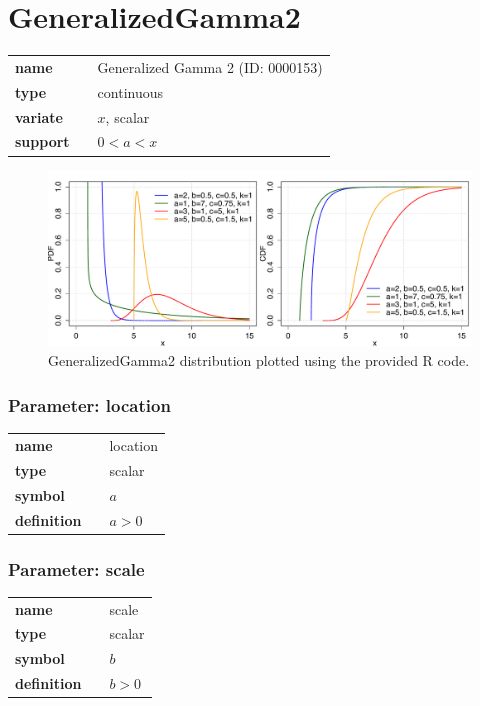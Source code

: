 \section*{GeneralizedGamma2} 

  \bigskip 

\begin{tabular}{p{2cm}cl}
\textbf{name} & & Generalized Gamma 2 (ID: 0000153)\\ 
 
\textbf{type} & & continuous \\ 

\textbf{variate} & & $x$, scalar \\ 

\textbf{support} & & $0 < a < x$
\end{tabular}

\begin{figure}[ht!]
\centering
  \includegraphics[width=140mm]{pics/GeneralizedGamma2.pdf}
 \caption{GeneralizedGamma2 distribution plotted using the provided R code.}
 \label{fig:GeneralizedGamma2}
\end{figure}

\subsubsection*{Parameter: location}

\noindent\begin{tabular}{p{2cm}cl}
\textbf{name} & & location \\
\textbf{type} & & scalar \\
\textbf{symbol} & & $a$  \\
\textbf{definition} & & $a > 0$
\end{tabular}
\subsubsection*{Parameter: scale}

\noindent\begin{tabular}{p{2cm}cl}
\textbf{name} & & scale \\
\textbf{type} & & scalar \\
\textbf{symbol} & & $b$  \\
\textbf{definition} & & $b > 0$
\end{tabular}
